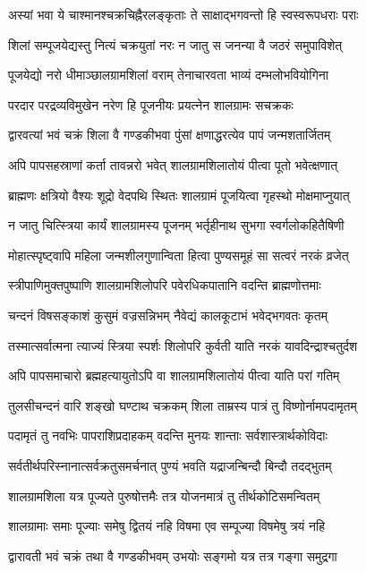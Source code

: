 \twolineshloka
{अस्यां भवा ये चाश्मानश्चक्रचिह्नैरलङ्कृताः}
{ते साक्षाद्भगवन्तो हि स्वस्वरूपधराः पराः}%

\twolineshloka
{शिलां सम्पूजयेद्यस्तु नित्यं चक्रयुतां नरः}
{न जातु स जनन्या वै जठरं समुपाविशेत्}%

\twolineshloka
{पूजयेद्यो नरो धीमाञ्छालग्रामशिलां वराम्}
{तेनाचारवता भाव्यं दम्भलोभवियोगिना}%

\twolineshloka
{परदार परद्रव्यविमुखेन नरेण हि}
{पूजनीयः प्रयत्नेन शालग्रामः सचक्रकः}%

\twolineshloka
{द्वारवत्यां भवं चक्रं शिला वै गण्डकीभवा}
{पुंसां क्षणाद्धरत्येव पापं जन्मशतार्जितम्}%

\twolineshloka
{अपि पापसहस्राणां कर्ता तावन्नरो भवेत्}
{शालग्रामशिलातोयं पीत्वा पूतो भवेत्क्षणात्}%

\twolineshloka
{ब्राह्मणः क्षत्रियो वैश्यः शूद्रो वेदपथि स्थितः}
{शालग्रामं पूजयित्वा गृहस्थो मोक्षमाप्नुयात्}%

\twolineshloka
{न जातु चित्स्त्रिया कार्यं शालग्रामस्य पूजनम्}
{भर्तृहीनाथ सुभगा स्वर्गलोकहितैषिणी}%

\twolineshloka
{मोहात्स्पृष्ट्वापि महिला जन्मशीलगुणान्विता}
{हित्वा पुण्यसमूहं सा सत्वरं नरकं व्रजेत्}%

\twolineshloka
{स्त्रीपाणिमुक्तपुष्पाणि शालग्रामशिलोपरि}
{पवेरधिकपातानि वदन्ति ब्राह्मणोत्तमाः}%

\twolineshloka
{चन्दनं विषसङ्काशं कुसुमं वज्रसन्निभम्}
{नैवेद्यं कालकूटाभं भवेद्भगवतः कृतम्}%

\twolineshloka
{तस्मात्सर्वात्मना त्याज्यं स्त्रिया स्पर्शः शिलोपरि}
{कुर्वती याति नरकं यावदिन्द्राश्चतुर्दश}%

\twolineshloka
{अपि पापसमाचारो ब्रह्महत्यायुतोऽपि वा}
{शालग्रामशिलातोयं पीत्वा याति परां गतिम्}%

\twolineshloka
{तुलसीचन्दनं वारि शङ्खो घण्टाथ चक्रकम्}
{शिला ताम्रस्य पात्रं तु विष्णोर्नामपदामृतम्}%

\twolineshloka
{पदामृतं तु नवभिः पापराशिप्रदाहकम्}
{वदन्ति मुनयः शान्ताः सर्वशास्त्रार्थकोविदाः}%

\twolineshloka
{सर्वतीर्थपरिस्नानात्सर्वक्रतुसमर्चनात्}
{पुण्यं भवति यद्राजन्बिन्दौ बिन्दौ तदद्भुतम्}%

\twolineshloka
{शालग्रामशिला यत्र पूज्यते पुरुषोत्तमैः}
{तत्र योजनमात्रं तु तीर्थकोटिसमन्वितम्}%

\twolineshloka
{शालग्रामाः समाः पूज्याः समेषु द्वितयं नहि}
{विषमा एव सम्पूज्या विषमेषु त्रयं नहि}%

\twolineshloka
{द्वारावती भवं चक्रं तथा वै गण्डकीभवम्}
{उभयोः सङ्गमो यत्र तत्र गङ्गा समुद्रगा}%

